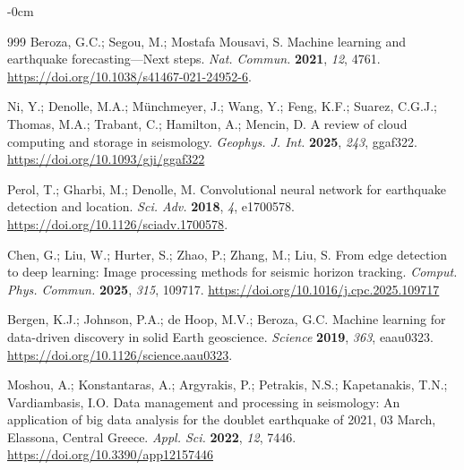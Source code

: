 \documentclass[data,article,accept,pdftex,moreauthors]{Definitions/mdpi}
\begin{document}
\begin{adjustwidth}{-\extralength}{0cm}
\begin{thebibliography}{999}
Beroza, G.C.; Segou, M.; Mostafa Mousavi, S. Machine learning and earthquake forecasting---Next steps. \emph{Nat. Commun.} \textbf{2021}, \emph{12}, 4761. \url{https://doi.org/10.1038/s41467-021-24952-6}. %

Ni, Y.; Denolle, M.A.; M{\"u}nchmeyer, J.; Wang, Y.; Feng, K.F.; Suarez, C.G.J.; Thomas, M.A.; Trabant, C.; Hamilton, A.; Mencin, D. A review of cloud computing and storage in seismology. \emph{Geophys. J. Int.} \textbf{2025}, \emph{243}, ggaf322. \url{https://doi.org/10.1093/gji/ggaf322}

Perol, T.; Gharbi, M.; Denolle, M. Convolutional neural network for earthquake detection and location. %
 \emph{Sci. Adv.} \textbf{2018}, \emph{4}, e1700578. %
 \url{https://doi.org/10.1126/sciadv.1700578}.

Chen, G.; Liu, W.; Hurter, S.; Zhao, P.; Zhang, M.; Liu, S. From edge detection to deep learning: Image processing methods for seismic horizon tracking. \emph{Comput. Phys. Commun.} \textbf{2025}, \emph{315}, 109717. \url{https://doi.org/10.1016/j.cpc.2025.109717}

Bergen, K.J.; Johnson, P.A.; de Hoop, M.V.; Beroza, G.C. Machine learning for data-driven discovery in solid Earth geoscience. \emph{Science} \textbf{2019}, \emph{363}, eaau0323. \url{https://doi.org/10.1126/science.aau0323}.

Moshou, A.; Konstantaras, A.; Argyrakis, P.; Petrakis, N.S.; Kapetanakis, T.N.; Vardiambasis, I.O. Data management and processing in seismology: An application of big data analysis for the doublet earthquake of 2021, 03 March, Elassona, Central Greece. \emph{Appl. Sci.} \textbf{2022}, \emph{12}, 7446. \url{https://doi.org/10.3390/app12157446}


\end{thebibliography}
\end{adjustwidth}
\end{document}
